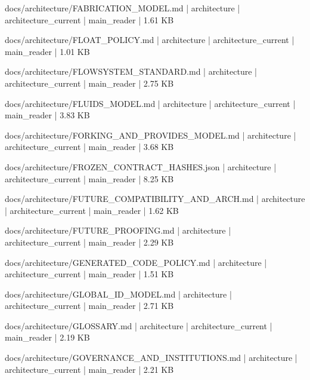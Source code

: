 \documentclass[11pt,a4paper]{report}
\begin{document}
{\small\ttfamily\raggedright docs/\allowbreak{}architecture/\allowbreak{}FABRICATION\_MODEL.\allowbreak{}md | architecture | architecture\_current | main\_reader | 1.\allowbreak{}61 KB\par}
{\small\ttfamily\raggedright docs/\allowbreak{}architecture/\allowbreak{}FLOAT\_POLICY.\allowbreak{}md | architecture | architecture\_current | main\_reader | 1.\allowbreak{}01 KB\par}
{\small\ttfamily\raggedright docs/\allowbreak{}architecture/\allowbreak{}FLOWSYSTEM\_STANDARD.\allowbreak{}md | architecture | architecture\_current | main\_reader | 2.\allowbreak{}75 KB\par}
{\small\ttfamily\raggedright docs/\allowbreak{}architecture/\allowbreak{}FLUIDS\_MODEL.\allowbreak{}md | architecture | architecture\_current | main\_reader | 3.\allowbreak{}83 KB\par}
{\small\ttfamily\raggedright docs/\allowbreak{}architecture/\allowbreak{}FORKING\_AND\_PROVIDES\_MODEL.\allowbreak{}md | architecture | architecture\_current | main\_reader | 3.\allowbreak{}68 KB\par}
{\small\ttfamily\raggedright docs/\allowbreak{}architecture/\allowbreak{}FROZEN\_CONTRACT\_HASHES.\allowbreak{}json | architecture | architecture\_current | main\_reader | 8.\allowbreak{}25 KB\par}
{\small\ttfamily\raggedright docs/\allowbreak{}architecture/\allowbreak{}FUTURE\_COMPATIBILITY\_AND\_ARCH.\allowbreak{}md | architecture | architecture\_current | main\_reader | 1.\allowbreak{}62 KB\par}
{\small\ttfamily\raggedright docs/\allowbreak{}architecture/\allowbreak{}FUTURE\_PROOFING.\allowbreak{}md | architecture | architecture\_current | main\_reader | 2.\allowbreak{}29 KB\par}
{\small\ttfamily\raggedright docs/\allowbreak{}architecture/\allowbreak{}GENERATED\_CODE\_POLICY.\allowbreak{}md | architecture | architecture\_current | main\_reader | 1.\allowbreak{}51 KB\par}
{\small\ttfamily\raggedright docs/\allowbreak{}architecture/\allowbreak{}GLOBAL\_ID\_MODEL.\allowbreak{}md | architecture | architecture\_current | main\_reader | 2.\allowbreak{}71 KB\par}
{\small\ttfamily\raggedright docs/\allowbreak{}architecture/\allowbreak{}GLOSSARY.\allowbreak{}md | architecture | architecture\_current | main\_reader | 2.\allowbreak{}19 KB\par}
{\small\ttfamily\raggedright docs/\allowbreak{}architecture/\allowbreak{}GOVERNANCE\_AND\_INSTITUTIONS.\allowbreak{}md | architecture | architecture\_current | main\_reader | 2.\allowbreak{}21 KB\par}
\end{document}
